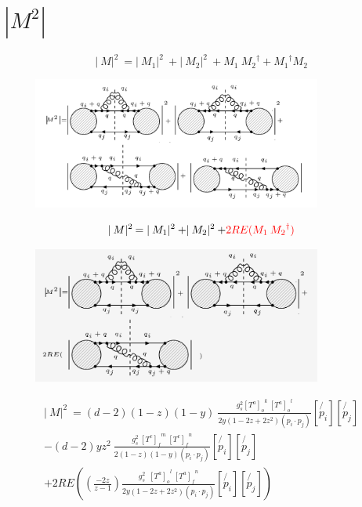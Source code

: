 \pagebreak

\section{$|M^{2}|$}
\begin{equation}
\lvert\:M\lvert^2\: = \lvert\:M_1\lvert^2\:+\lvert\:M_2\lvert^2\:+ M_1\: {M_2}^{\dagger} +{M_1}^{\dagger} M_2
\end{equation}
\begin{figure}[h!]
\centering
\includegraphics[width=0.85\textwidth]{images/qqgMSquer.png}
\end{figure}
\begin{equation}
\lvert\:M\lvert^2\: = \lvert\:M_1\lvert^2\:+\lvert\:M_2\lvert^2\:+ {\color[RGB]{255,0,0} 2RE(M_1\: {M_2}^{\dagger})}
\end{equation}
\begin{figure}[h!]
\centering
\includegraphics[width=0.85\textwidth]{images/REqqgMSquer.png}
\end{figure}
\begin{equation}
\begin{split}
\lvert\:M\lvert^2\: = (d-2)(1-z)(1-y)\:\frac{g_s^2  {[T^a]_{o}}^k \: {[T^a]_o}^l }{2y(1-2z+2z^2)(p_i \cdot p_j)}
[\not{p_i}][\not{p_j}]\\
-(d-2)yz^2\:\frac{g_s^2 \: {[T^c]_f}^m \: {[T^c]_{f}}^n }{2(1-z)(1-y)(p_i \cdot p_j)}
[\not{p_i}][\not{p_j}]\\
+2RE((\frac{-2z}{z-1}) \frac{g_s^2 \:\:{[T^a]_o}^l \:{[T^a]_{f}}^n }{2y(1-2z+2z^2)(p_i \cdot p_j)} 
[\not{p_i}][\not{p_j}])
\end{split}
\end{equation}

